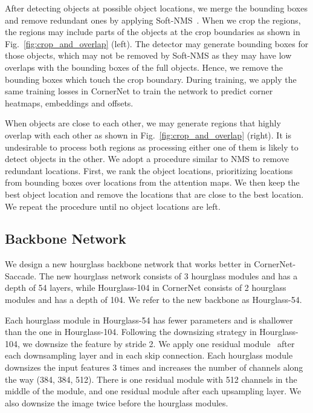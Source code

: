 \documentclass{bmvc2k}
\begin{document}
After detecting objects at possible object locations, we merge the bounding boxes and remove redundant ones by applying Soft-NMS~\cite{bodla2017soft}. When we crop the regions, the regions may include parts of the objects at the crop boundaries as shown in Fig.~\ref{fig:crop_and_overlap} (left). The detector may generate bounding boxes for those objects, which may not be removed by Soft-NMS as they may have low overlaps with the bounding boxes of the full objects. Hence, we remove the bounding boxes which touch the crop boundary. During training, we apply the same training losses in CornerNet to train the network to predict corner heatmaps, embeddings and offsets.

When objects are close to each other, we may generate regions that highly overlap with each other as shown in Fig.~\ref{fig:crop_and_overlap} (right). It is undesirable to process both regions as processing either one of them is likely to detect objects in the other. We adopt a procedure similar to NMS to remove redundant locations. First, we rank the object locations, prioritizing locations from bounding boxes over locations from the attention maps. We then keep the best object location and remove the locations that are close to the best location. We repeat the procedure until no object locations are left.

\subsection{Backbone Network}
\label{sec:backbone}
We design a new hourglass backbone network that works better in CornerNet-Saccade. The new hourglass network consists of 3 hourglass modules and has a depth of 54 layers, while Hourglass-104 in CornerNet consists of 2 hourglass modules and has a depth of 104. We refer to the new backbone as Hourglass-54.

Each hourglass module in Hourglass-54 has fewer parameters and is shallower than the one in Hourglass-104. Following the downsizing strategy in Hourglass-104, we downsize the feature by stride 2. We apply one residual module~\cite{he2016deep} after each downsampling layer and in each skip connection. Each hourglass module downsizes the input features 3 times and increases the number of channels along the way (384, 384, 512). There is one residual module with 512 channels in the middle of the module, and one residual module after each upsampling layer. We also downsize the image twice before the hourglass modules.
\end{document}
